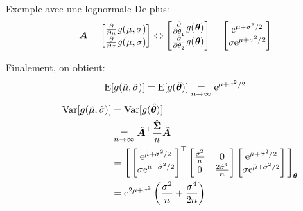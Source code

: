 \documentclass[10pt, french]{article}
\begin{document}
\begin{multicols*}{3}
\begin{examplebox}{Exemple avec une lognormale}
De plus:
\begin{align*}
	\bm{A}
	&=
	\begin{bmatrix}
		\frac{\partial^{}}{\partial \mu^{}}g(\mu, \sigma)	\\
		\frac{\partial^{}}{\partial \sigma^{}}g(\mu, \sigma)	\\
	\end{bmatrix}
	\Leftrightarrow
	\begin{bmatrix}
		\frac{\partial^{}}{\partial \theta_{1}^{}}g(\bm\theta)	\\
		\frac{\partial^{}}{\partial \theta_{2}^{}}g(\bm\theta)	\\
	\end{bmatrix}
	=
	\begin{bmatrix}
		\mathrm{e}^{{\mu} + {\sigma}^{2}/2}	\\
		\sigma\mathrm{e}^{{\mu} + {\sigma}^{2}/2}	\\
	\end{bmatrix}
\end{align*}
\setlength{\mathindent}{-1.5cm}

Finalement, on obtient:
\begin{align*}
	\text{E}[g(\hat{\mu}, \hat{\sigma})]	
	&=	\text{E}[g(\hat{\bm\theta})]
	\underset{n \rightarrow \infty}{=}	\mathrm{e}^{\mu + {\sigma}^{2}/2}	
\end{align*}
\begin{align*}
	\text{Var}[g(\hat{\mu}, \hat{\sigma})]	
	&=	\text{Var}[g(\hat{\bm\theta})]	\\
	&\underset{n \rightarrow \infty}{=}	\hat{\bm{A}}^{\top} \frac{\hat{\bm{\Sigma}}}{n} \hat{\bm{A}}	\\
	&=	\Bigg[
	\begin{bmatrix}
		\mathrm{e}^{\hat{\mu} + \hat{\sigma}^{2}/2}	\\
		\sigma\mathrm{e}^{\hat{\mu} + \hat{\sigma}^{2}/2}	\\
	\end{bmatrix}^{\top} 
	\begin{bmatrix}
		\frac{\hat\sigma^{2}}{n}	&	0						\\
		0					&	\frac{2\hat\sigma^{4}}{n}	\\
	\end{bmatrix}
	\begin{bmatrix}
		\mathrm{e}^{\hat{\mu} + \hat{\sigma}^{2}/2}	\\
		\sigma\mathrm{e}^{\hat{\mu} + \hat{\sigma}^{2}/2}	\\
	\end{bmatrix} 
		\Bigg] _{\bm{\theta}}	\\
	&=	\mathrm{e}^{2\mu + \sigma^{2}} \left( \frac{\sigma^{2}}{n} + \frac{\sigma^{4}}{2n} \right)
\end{align*}
\end{examplebox}


\end{multicols*}
\end{document}
